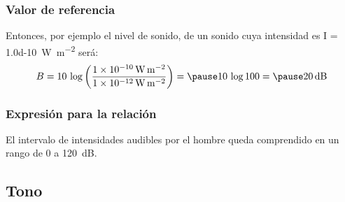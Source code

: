 \documentclass[14pt]{beamer}
\begin{document}
\begin{frame}
\frametitle{Valor de referencia}
Entonces, por ejemplo el nivel de sonido, de un sonido cuya intensidad es I = \SI{1.0d-10}{\watt\per\square\meter} será:
\pause
\begin{eqnarray*}
\begin{aligned}
B =10 \, \log \left( \dfrac{\SI{1d-10}{\watt\per\square\meter}}{\SI{1d-12}{\watt\per\square\meter}} \right) = \pause 10 \, \log 100 = \pause \SI{20}{\dB}
\end{aligned}
\end{eqnarray*}
\end{frame}
\begin{frame}
\frametitle{Expresión para la relación}
El intervalo de intensidades audibles por el hombre queda comprendido en un rango de $0$ a \SI{120}{\dB}.
\end{frame}

\subsection{Tono}
\end{document}
